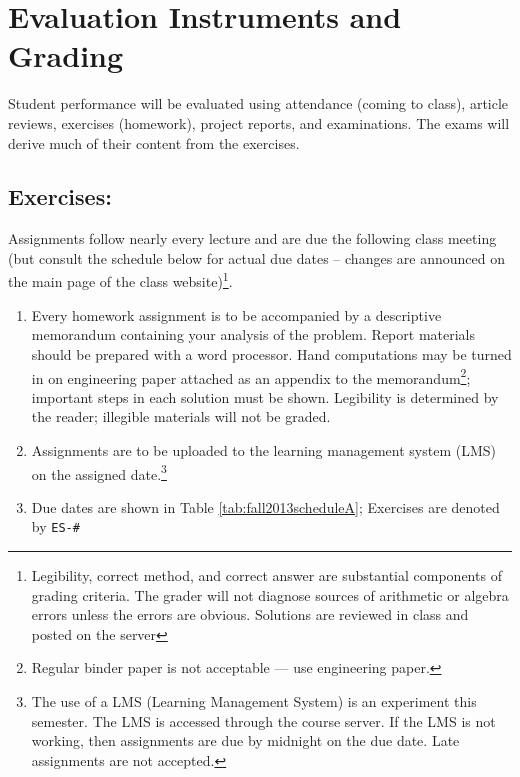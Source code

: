 \documentclass[12pt]{article}
\begin{document}
\section*{Evaluation Instruments and Grading}
Student performance will be evaluated using attendance (coming to class), article reviews, exercises (homework), project reports, and examinations.   The exams will derive much of their content from the exercises.  %


\subsection*{Exercises:} 
Assignments follow nearly every lecture and are due the following class meeting (but consult the schedule below for actual due dates -- changes are announced on the main page of the class website)\footnote{Legibility, correct method, and correct answer are substantial components of grading criteria.   The grader will not diagnose sources of arithmetic or algebra errors unless the errors are obvious.  Solutions are reviewed in class and posted on the server}.
\begin{enumerate}
\item Every homework assignment is to be accompanied by a descriptive memorandum containing your analysis
of the problem. 
Report materials should be prepared with a word processor. 
Hand computations may be turned in on engineering paper attached as an appendix to the memorandum\footnote{Regular binder paper is not acceptable --- use engineering paper.}; important steps in each solution must be shown. 
Legibility is determined by the reader; illegible materials will not be graded.
\item Assignments are to be uploaded to the learning management system (LMS) on the assigned date.\footnote{The use of a LMS (Learning Management System) is an experiment this semester.  The LMS is accessed through the course server.  If the LMS is not working, then assignments are due by midnight on the due date. Late assignments are not accepted.}
\item Due dates are shown in Table \ref{tab:fall2013scheduleA};  Exercises are denoted by \texttt{ES-\#}
\end{enumerate}
\end{document}
